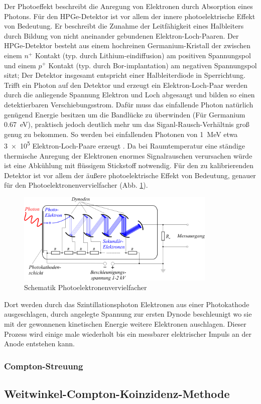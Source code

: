 Der Photoeffekt beschreibt die Anregung von Elektronen durch Absorption eines Photons.
Für den HPGe-Detektor ist vor allem der innere photoelektrische Effekt von Bedeutung. Er beschreibt die Zunahme der Leitfähigkeit eines Halbleiters durch Bildung von nicht aneinander gebundenen Elektron-Loch-Paaren. Der HPGe-Detektor besteht aus einem hochreinen Germanium-Kristall der zwischen einem $n^{+}$ Kontakt (typ. durch Lithium-eindiffusion) am positiven Spannungspol und einem $p^{+}$ Kontakt (typ. durch Bor-implantation) am negativen Spannungspol sitzt; Der Detektor insgesamt entspricht einer Halbleiterdiode in Sperrichtung. Trifft ein Photon auf den Detektor und erzeugt ein Elektron-Loch-Paar werden durch die anliegende Spannung Elektron und Loch abgesaugt und bilden so einen detektierbaren Verschiebungsstrom. Dafür muss das einfallende Photon natürlich genügend Energie besitzen um die Bandlücke zu überwinden (Für Germanium \SI{0.67}{\electronvolt}), praktisch jedoch deutlich mehr um das Siganl-Rausch-Verhältnis groß genug zu bekommen. So werden bei einfallenden Photonen von \SI{1}{\mega\electronvolt} etwa \num{3e5} Elektron-Loch-Paare erzeugt \cite{HPGe-Detektor}. Da bei Raumtemperatur eine ständige thermische Anregung der Elektronen enormes Signalrauschen verursachen würde ist eine Abkühlung mit flüssigem Stickstoff notwendig.
Für den zu kalibrierenden Detektor ist vor allem der äußere photoelektrische Effekt von Bedeutung, genauer für den Photoelektronenvervielfacher (Abb. \ref{theorie_PEV}).

\begin{figure}[ht]
	\centering
  \includegraphics[width=0.85\textwidth]{images/Photomultiplier_schema_de.png}
	\caption{Schematik Photoelektronenvervielfacher}
	\label{theorie_PEV}
\end{figure}

Dort werden durch das Szintillationsphoton Elektronen aus einer Photokathode ausgeschlagen, durch angelegte Spannung zur ersten Dynode beschleunigt wo sie mit der gewonnenen kinetischen Energie weitere Elektronen auschlagen. Dieser Prozess wird einige male wiederholt bis ein messbarer elektrischer Impuls an der Anode entstehen kann.

\subsubsection{Compton-Streuung}

\subsection{Weitwinkel-Compton-Koinzidenz-Methode}
